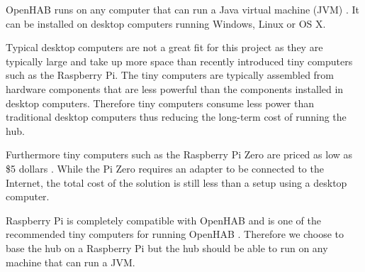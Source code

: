 OpenHAB runs on any computer that can run a Java virtual machine (JVM) \cite{openhab:introduction}. It can be installed on desktop computers running Windows, Linux or OS X.

Typical desktop computers are not a great fit for this project as they are typically large and take up more space than recently introduced tiny computers such as the Raspberry Pi. The tiny computers are typically assembled from hardware components that are less powerful than the components installed in desktop computers. Therefore tiny computers consume less power than traditional desktop computers thus reducing the long-term cost of running the hub.

Furthermore tiny computers such as the Raspberry Pi Zero are priced as low as \$5 dollars \cite{raspberrypi:zero}. While the Pi Zero requires an adapter to be connected to the Internet, the total cost of the solution is still less than a setup using a desktop computer.

Raspberry Pi is completely compatible with OpenHAB and is one of the recommended tiny computers for running OpenHAB \cite{openhab:hardware}. Therefore we choose to base the hub on a Raspberry Pi but the hub should be able to run on any machine that can run a JVM.

